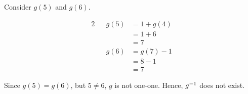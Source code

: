 \documentclass{echw}
\begin{document}

            \subpart
                Consider $g(5)$ and $g(6)$.

                \begin{alignat*}{2}
                    && g(5) &= 1 + g(4)\\
                    && &= 1 + 6\\
                    && &= 7\\
                    && g(6) &= g(7) - 1\\
                    && &= 8 - 1\\
                    && &= 7
                \end{alignat*}

                Since $g(5) = g(6)$, but $5 \neq 6$, $g$ is not one-one. Hence, $g^{-1}$ does not exist.

\end{document}
